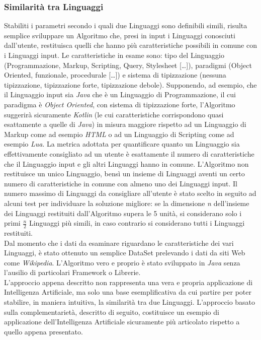 \subsubsection{Similarità tra Linguaggi}
Stabiliti i parametri secondo i quali due Linguaggi sono definibili simili, risulta semplice sviluppare un Algoritmo che, presi in input i Linguaggi conosciuti dall'utente, restituisca quelli che hanno più caratteristiche possibili in comune con i Linguaggi input. Le caratteristiche in esame sono: tipo del Linguaggio (Programmazione, Markup, Scripting, Query, Stylesheet [\dots]), paradigmi (Object Oriented, funzionale, procedurale [\dots]) e sistema di tipizzazione (nessuna tipizzazione, tipizzazione forte, tipizzazione debole). 
Supponendo, ad esempio, che il Linguaggio input sia \emph{Java} che è un Linguaggio di Programmazione, il cui paradigma è \emph{Object Oriented}, con sistema di tipizzazione forte, l'Algoritmo suggerirà sicuramente \emph{Kotlin} (le cui caratteristiche corrispondono quasi esattamente a quelle di \emph{Java}) in misura maggiore rispetto ad un Linguaggio di Markup come ad esempio \emph{HTML} o ad un Linguaggio di Scripting come ad esempio \emph{Lua}. 
La metrica adottata per quantificare quanto un Linguaggio sia effettivamente consigliato ad un utente è esattamente il numero di caratteristiche che il Linguaggio input e gli altri Linguaggi hanno in comune. 
L'Algoritmo non restituisce un unico Linguaggio, bensì un insieme di Linguaggi aventi un certo numero di caratteristiche in comune con almeno uno dei Linguaggi input. Il numero massimo di Linguaggi da consigliare all'utente è stato scelto in seguito ad alcuni test per individuare la soluzione migliore: se la dimensione \emph{n} dell'insieme dei Linguaggi restituiti dall'Algoritmo supera le 5 unità, si considerano solo i primi \(\frac{n}{2}\) Linguaggi più simili, in caso contrario si considerano tutti i Linguaggi restituiti. \\
Dal momento che i dati da esaminare riguardano le caratteristiche dei vari Linguaggi, è stato ottenuto un semplice DataSet prelevando i dati da siti Web come \emph{Wikipedia}. L'Algoritmo vero e proprio è stato sviluppato in \emph{Java} senza l'ausilio di particolari Framework o Librerie. \\
L'approccio appena descritto non rappresenta una vera e propria applicazione di Intelligenza Artificiale, ma solo una base esemplificativa da cui partire per poter stabilire, in maniera intuitiva, la similarità tra due Linguaggi. L'approccio basato sulla complementarietà, descritto di seguito, costituisce un esempio di applicazione dell'Intelligenza Artificiale sicuramente più articolato rispetto a quello appena presentato.
